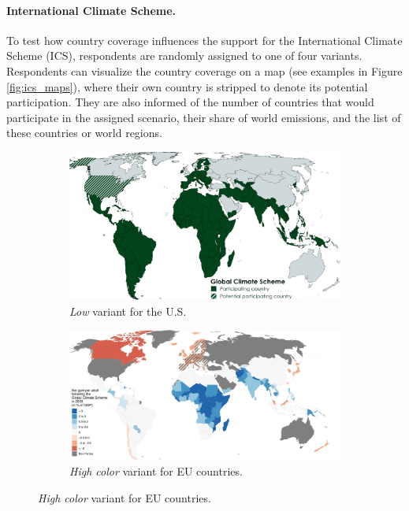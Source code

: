 \documentclass[12pt,english]{article}
\begin{document}
\begin{bibunit}
\paragraph{International Climate Scheme.}
To test how country coverage influences the support for the International Climate Scheme (ICS), respondents are randomly assigned to one of four variants. Respondents can visualize the country coverage on a map (see examples in Figure \ref{fig:ics_maps}), where their own country is stripped to denote its potential participation. They are also informed of the number of countries that would participate in the assigned scenario, their share of world emissions, and the list of these countries or world regions. 
\begin{figure}[h!]
\caption[Example maps of the International Climate Scheme]{Example maps of the International Climate Scheme question. (Question \ref{q:ics_support}).} \label{fig:ics_maps}
\begin{subfigure}{.49\textwidth}
  \caption[]{\textit{Low} variant for the U.S.}
  \includegraphics[height=.49\textwidth]{../figures/maps_participation/GCS_low_EN.png}
\end{subfigure} 
\begin{subfigure}{.49\textwidth}
  \caption[]{\textit{High color} variant for EU countries.}%
  \includegraphics[height=.49\textwidth]{../figures/maps_participation/GCS_high_color_EU.pdf}%
\end{subfigure}
\end{figure}


\end{bibunit}
\end{document}
